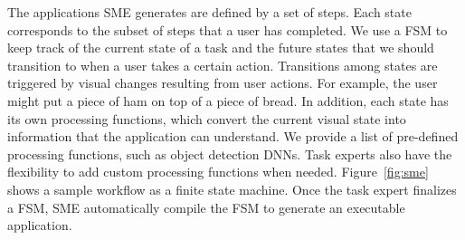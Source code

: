 The applications SME generates are defined by a set of steps.
Each state corresponds to the subset of steps that a user has completed.
We use a FSM to keep track of the current state of a task and the future states
that we should transition to when a user takes a certain action.
Transitions among states are triggered by visual changes resulting from user
actions. For example, the user might put a piece of ham on top of a piece of
bread. In addition, each state has its own processing functions, which convert the current visual state into information that the
application can understand. We
provide a list of pre-defined processing functions, such as object
detection DNNs. Task experts also have the flexibility to add custom processing
functions when needed. Figure~\ref{fig:sme} shows a sample workflow
as a finite state machine. Once the task expert finalizes a FSM, SME automatically compile the FSM to generate an executable application.
